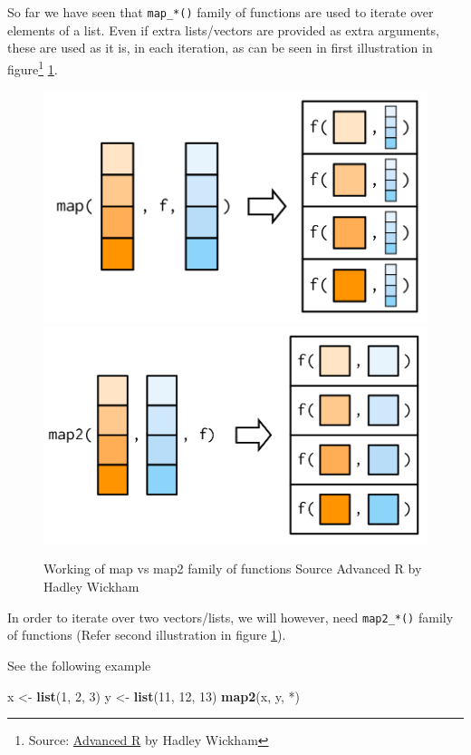 \documentclass[
]{book}
\newenvironment{Shaded}{\begin{snugshade}}{\end{snugshade}}
\newcommand{\AttributeTok}[1]{\textcolor[rgb]{0.13,0.29,0.53}{#1}}
\newcommand{\DecValTok}[1]{\textcolor[rgb]{0.00,0.00,0.81}{#1}}
\newcommand{\FunctionTok}[1]{\textcolor[rgb]{0.13,0.29,0.53}{\textbf{#1}}}
\newcommand{\NormalTok}[1]{#1}
\newcommand{\OtherTok}[1]{\textcolor[rgb]{0.56,0.35,0.01}{#1}}
\newcommand{\StringTok}[1]{\textcolor[rgb]{0.31,0.60,0.02}{#1}}
\begin{document}
So far we have seen that \texttt{map\_*()} family of functions are used to iterate over elements of a list. Even if extra lists/vectors are provided as extra arguments, these are used as it is, in each iteration, as can be seen in first illustration in figure\footnote{Source: \href{https://adv-r.hadley.nz/functionals.html}{Advanced R} by Hadley Wickham} \ref{fig:map2}.

\begin{figure}

{\centering \includegraphics[width=0.49\linewidth]{images/map1} \includegraphics[width=0.49\linewidth]{images/map2} 

}

\caption{Working of map vs map2 family of functions \hspace{\textwidth} Source Advanced R by Hadley Wickham}\label{fig:map2}
\end{figure}

In order to iterate over two vectors/lists, we will however, need \texttt{map2\_*()} family of functions (Refer second illustration in figure \ref{fig:map2}).

See the following example

\begin{Shaded}
\begin{Highlighting}[]
\NormalTok{x }\OtherTok{\textless{}{-}} \FunctionTok{list}\NormalTok{(}\DecValTok{1}\NormalTok{, }\DecValTok{2}\NormalTok{, }\DecValTok{3}\NormalTok{)}
\NormalTok{y }\OtherTok{\textless{}{-}} \FunctionTok{list}\NormalTok{(}\DecValTok{11}\NormalTok{, }\DecValTok{12}\NormalTok{, }\DecValTok{13}\NormalTok{)}
\FunctionTok{map2}\NormalTok{(x, y, }\StringTok{\textasciigrave{}}\AttributeTok{*}\StringTok{\textasciigrave{}}\NormalTok{)}
\end{Highlighting}
\end{Shaded}
\end{document}
